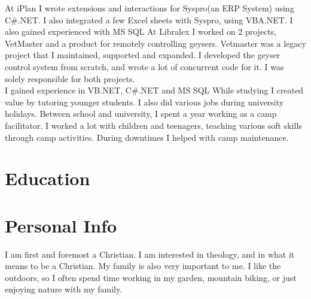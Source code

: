 \documentclass[a4paper]{twentysecondcv} %
\begin{document}
\begin{twenty}
    {At iPlan I wrote extensions and interactions for Syspro(an ERP System) using C\#.NET. I also integrated a few Excel sheets with Syspro, using VBA.NET. I also gained experienced with MS SQL}
    {At Libralex I worked on 2 projects, VetMaster and a product for remotely controlling geysers. Vetmaster was a legacy project that I maintained, supported and expanded. I developed the geyser control system from scratch, and wrote a lot of concurrent code for it. I was solely responsible for both projects.\\
    I gained experience in VB.NET, C\#.NET and MS SQL}
    {While studying I created value by tutoring younger students. I also did various jobs during university holidays.}
    {Between school and university, I spent a year working as a camp facilitator. I worked a lot with children and teenagers, teaching various soft skills through camp activities. During downtimes I helped with camp maintenance.}
\end{twenty}

\newpage %

\makeprofile %


\section{Education}

\begin{twenty} %

\end{twenty}

\section{Personal Info}

I am first and foremost a Christian.
I am interested in theology, and in what it means to be a Christian.
My family is also very important to me.
I like the outdoors, so I often spend time working in my garden, mountain biking, or just enjoying nature with my family.
\end{document}
